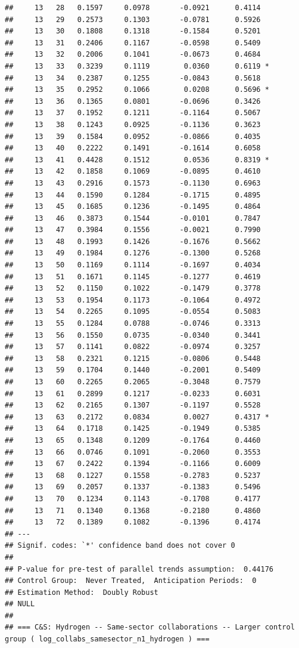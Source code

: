 \documentclass[
]{article}
\begin{document}
\begin{verbatim}
##     13   28   0.1597     0.0978       -0.0921      0.4114  
##     13   29   0.2573     0.1303       -0.0781      0.5926  
##     13   30   0.1808     0.1318       -0.1584      0.5201  
##     13   31   0.2406     0.1167       -0.0598      0.5409  
##     13   32   0.2006     0.1041       -0.0673      0.4684  
##     13   33   0.3239     0.1119        0.0360      0.6119 *
##     13   34   0.2387     0.1255       -0.0843      0.5618  
##     13   35   0.2952     0.1066        0.0208      0.5696 *
##     13   36   0.1365     0.0801       -0.0696      0.3426  
##     13   37   0.1952     0.1211       -0.1164      0.5067  
##     13   38   0.1243     0.0925       -0.1136      0.3623  
##     13   39   0.1584     0.0952       -0.0866      0.4035  
##     13   40   0.2222     0.1491       -0.1614      0.6058  
##     13   41   0.4428     0.1512        0.0536      0.8319 *
##     13   42   0.1858     0.1069       -0.0895      0.4610  
##     13   43   0.2916     0.1573       -0.1130      0.6963  
##     13   44   0.1590     0.1284       -0.1715      0.4895  
##     13   45   0.1685     0.1236       -0.1495      0.4864  
##     13   46   0.3873     0.1544       -0.0101      0.7847  
##     13   47   0.3984     0.1556       -0.0021      0.7990  
##     13   48   0.1993     0.1426       -0.1676      0.5662  
##     13   49   0.1984     0.1276       -0.1300      0.5268  
##     13   50   0.1169     0.1114       -0.1697      0.4034  
##     13   51   0.1671     0.1145       -0.1277      0.4619  
##     13   52   0.1150     0.1022       -0.1479      0.3778  
##     13   53   0.1954     0.1173       -0.1064      0.4972  
##     13   54   0.2265     0.1095       -0.0554      0.5083  
##     13   55   0.1284     0.0788       -0.0746      0.3313  
##     13   56   0.1550     0.0735       -0.0340      0.3441  
##     13   57   0.1141     0.0822       -0.0974      0.3257  
##     13   58   0.2321     0.1215       -0.0806      0.5448  
##     13   59   0.1704     0.1440       -0.2001      0.5409  
##     13   60   0.2265     0.2065       -0.3048      0.7579  
##     13   61   0.2899     0.1217       -0.0233      0.6031  
##     13   62   0.2165     0.1307       -0.1197      0.5528  
##     13   63   0.2172     0.0834        0.0027      0.4317 *
##     13   64   0.1718     0.1425       -0.1949      0.5385  
##     13   65   0.1348     0.1209       -0.1764      0.4460  
##     13   66   0.0746     0.1091       -0.2060      0.3553  
##     13   67   0.2422     0.1394       -0.1166      0.6009  
##     13   68   0.1227     0.1558       -0.2783      0.5237  
##     13   69   0.2057     0.1337       -0.1383      0.5496  
##     13   70   0.1234     0.1143       -0.1708      0.4177  
##     13   71   0.1340     0.1368       -0.2180      0.4860  
##     13   72   0.1389     0.1082       -0.1396      0.4174  
## ---
## Signif. codes: `*' confidence band does not cover 0
## 
## P-value for pre-test of parallel trends assumption:  0.44176
## Control Group:  Never Treated,  Anticipation Periods:  0
## Estimation Method:  Doubly Robust
## NULL
## 
## === C&S: Hydrogen -- Same-sector collaborations -- Larger control group ( log_collabs_samesector_n1_hydrogen ) ===
\end{verbatim}
\end{document}
